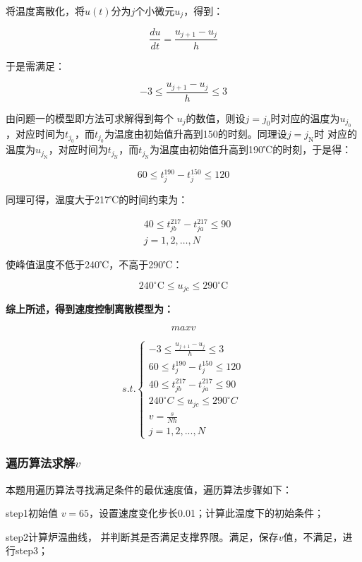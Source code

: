 \documentclass[withoutpreface,bwprint]{cumcmthesis} %
\numberwithin{equation}{subsection}
\newcommand{\toper}{\noindent \textbf}
\begin{document}
将温度离散化，将$u(t)$分为$j$个小微元$u_{j}$，得到：

$$\frac{du}{dt}=\frac{u_{j+1}-u_{j}}{h}$$

于是需满足：

$$-3\leq \frac{u_{j+1}-u_{j}}{h}\leq 3$$

由问题一的模型即方法可求解得到每个 $u_{j}$的数值，则设$j=j_{0}$时对应的温度为$u_{j_{0}}$，对应时间为$t_{j_{0}}$，而$t_{j_{0}}$为温度由初始值升高到150\textcelsius 的时刻。同理设$j= j_{\text{N}}$时
对应的温度为$u_{j_{\text{N}}}$，对应时间为$t_{j_{\text{N}}}$，而$t_{j_{\text{N}}}$为温度由初始值升高到190℃的时刻，于是得：

$$
60 \leq t_{j}^{190}-t_{j}^{150} \leq 120
$$

同理可得，温度大于217℃的时间约束为：

$$
\begin{aligned}
	&40 \leq t_{j b}^{217}-t_{j a}^{217} \leq 90 \\
	&j=1,2, \ldots, N
\end{aligned}
$$

使峰值温度不低于240℃，不高于290℃：

$$
240^{\circ} \mathrm{C} \leq u_{j c} \leq 290^{\circ} \mathrm{C}
$$

\toper {综上所述，得到速度控制离散模型为：}

$$maxv$$

\begin{equation}
	s.t.\left\{\begin{array}{l}
			-3\leq \frac{u_{j+1}-u_{j}}{h}\leq 3 \\
			60\leq t_{j}^{190} - t_{j}^{150} \leq 120 \\
			40\leq t_{jb}^{217}-t_{ja}^{217} \leq 90\\
			240^{\circ}C \leq u_{jc} \leq 290^{\circ}C\\
			v=\frac{s}{Nh}\\
			j = 1, 2,...,N \end{array}	\right.
\end{equation}

\subsubsection{遍历算法求解$v$}

本题用遍历算法寻找满足条件的最优速度值，遍历算法步骤如下：

step1\quad 初始值 $v=65$，设置速度变化步长0.01；计算此温度下的初始条件；

step2\quad  计算炉温曲线， 并判断其是否满足支撑界限。满足，保存$v$值，不满足，进行step3；
\end{document}
